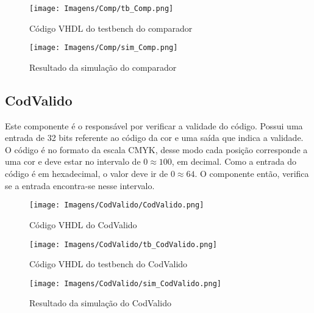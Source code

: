 \documentclass[12pt,a4paper,oneside]{abntex2}
\begin{document}
                \begin{figure}[H]
                    \centering
                    \texttt{[image: Imagens/Comp/tb\_Comp.png]}
                    \caption{Código VHDL do testbench do comparador}
                    \label{fig:tb_Comp}
                \end{figure}

                \begin{figure}[H]
                    \centering
                    \texttt{[image: Imagens/Comp/sim\_Comp.png]}
                    \caption{Resultado da simulação do comparador}
                    \label{fig:sim_Comp}
                \end{figure}

            \subsection{CodValido}
                Este componente é o responsável por verificar a validade do código. Possui uma entrada de 32 bits referente ao código da cor e uma saída que indica a validade. O código é no formato da escala CMYK, desse modo cada posição corresponde a uma cor e deve estar no intervalo de $0\approx100$, em decimal. Como a entrada do código é em hexadecimal, o valor deve ir de $0\approx64$. O componente então, verifica se a entrada encontra-se nesse intervalo.
                \begin{figure}[H]
                    \centering
                    \texttt{[image: Imagens/CodValido/CodValido.png]}
                    \caption{Código VHDL do CodValido}
                    \label{fig:CodValido}
                \end{figure}

                \begin{figure}[H]
                    \centering
                    \texttt{[image: Imagens/CodValido/tb\_CodValido.png]}
                    \caption{Código VHDL do testbench do CodValido}
                    \label{fig:tb_CodValido}
                \end{figure}

                \begin{figure}[H]
                    \centering
                    \texttt{[image: Imagens/CodValido/sim\_CodValido.png]}
                    \caption{Resultado da simulação do CodValido}
                    \label{fig:sim_CodValido}
                \end{figure}
                
\end{document}
